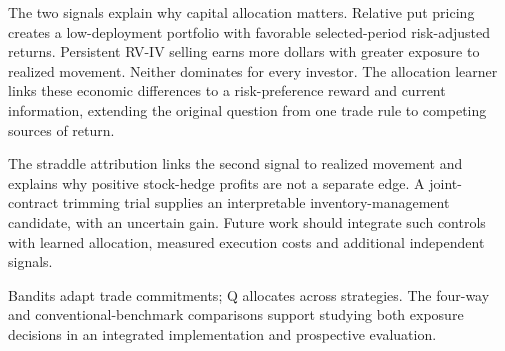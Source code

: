 The two signals explain why capital allocation matters. Relative put pricing creates a low-deployment portfolio with favorable selected-period risk-adjusted returns. Persistent RV-IV selling earns more dollars with greater exposure to realized movement. Neither dominates for every investor. The allocation learner links these economic differences to a risk-preference reward and current information, extending the original question from one trade rule to competing sources of return.


The straddle attribution links the second signal to realized movement and explains why positive stock-hedge profits are not a separate edge. A joint-contract trimming trial supplies an interpretable inventory-management candidate, with an uncertain gain. Future work should integrate such controls with learned allocation, measured execution costs and additional independent signals.


Bandits adapt trade commitments; Q allocates across strategies. The four-way and conventional-benchmark comparisons support studying both exposure decisions in an integrated implementation and prospective evaluation.


\FloatBarrier
